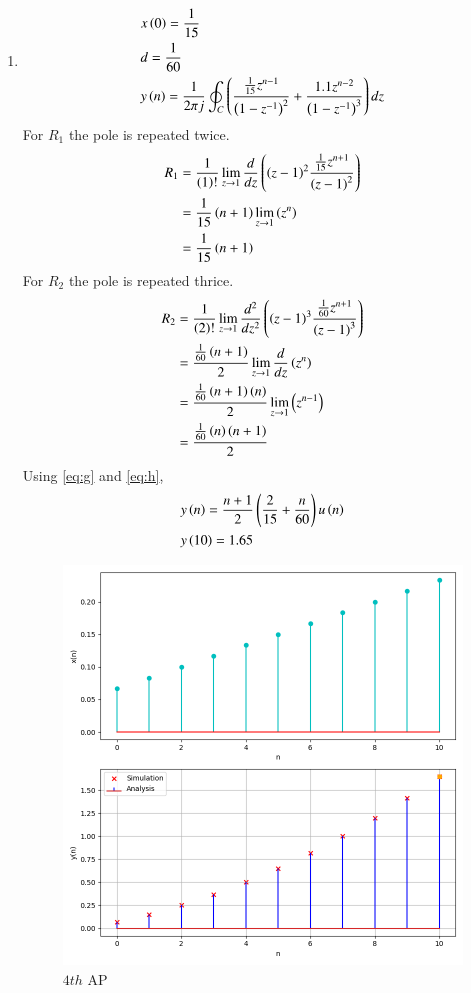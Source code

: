 \documentclass[journal,12pt,twocolumn]{IEEEtran}
\theoremstyle{remark}
\begin{document}
\begin{enumerate}[label=(\alph*)]
\item \begin{align}
        &x\left(0\right)=\frac{1}{15} \\
        &d=\frac{1}{60} \\
        &y\left(n\right)=\frac{1}{2\pi j}\oint_{C}\left(\dfrac{\frac{1}{15}z^{n-1}}{\left(1-z^{-1}\right)^2} + \dfrac{1.1z^{n-2}}{\left(1-z^{-1}\right)^{3}}\right)dz \\
    \end{align}
    For $R_1$ the pole is repeated twice.
\begin{align}
    R_1&=\frac{1}{\left(1\right)!}\lim\limits_{z\to 1}\frac{d}{dz}\left({\left(z-1\right)}^{2}\frac{\frac{1}{15}z^{n+1}}{{\left(z-1\right)}^2}\right)\\
    &=\frac{1}{15}\left(n+1\right)\lim\limits_{z\to 1}\left(z^n\right)\\
    &=\frac{1}{15}\left(n+1\right)\label{eq:g}
\end{align}
    For $R_2$ the pole is repeated thrice.
\begin{align}
    R_2&=\frac{1}{\left(2\right)!}\lim\limits_{z\to 1}\frac{d^{2}}{dz^{2}}\left({\left(z-1\right)}^{3}\frac{\frac{1}{60}z^{n+1}}{{\left(z-1\right)}^3}\right)\\
    &=\frac{\frac{1}{60}\left(n+1\right)}{2}\lim\limits_{z\to 1}\frac{d}{dz}\left(z^n\right)\\
    &=\frac{\frac{1}{60}\left(n+1\right)\left(n\right)}{2}\lim\limits_{z\to 1}\left(z^{n-1}\right)\\
    &=\frac{\frac{1}{60}\left(n\right)\left(n+1\right)}{2}\label{eq:h}
\end{align}
Using \eqref{eq:g} and \eqref{eq:h},
\begin{align}
    &y\left(n\right)=\dfrac{n+1}{2}\left(\frac{2}{15}+\frac{n}{60}\right)u\left(n\right)\\
    &y\left(10\right)=1.65
\end{align}
\begin{figure}[h!]
        \centering
        \includegraphics[width=\columnwidth]{figs/plt4.png}
        \caption{$4th$ AP}
    \end{figure}
\end{enumerate}
\end{document}
